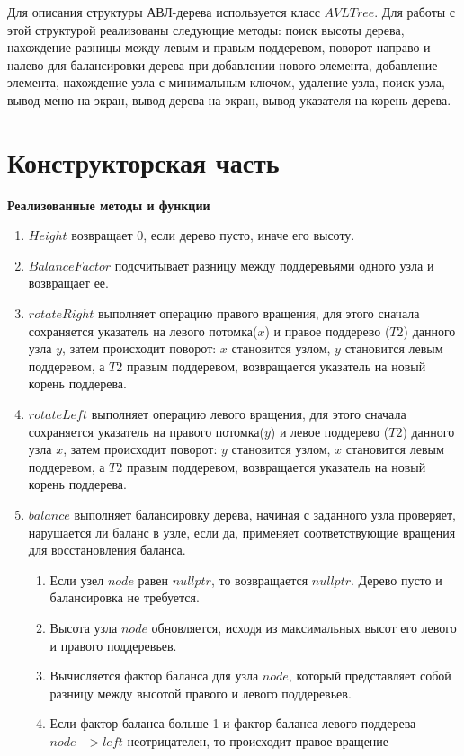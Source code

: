 \documentclass[12pt, a4paper]{article}
\begin{document}
Для описания структуры АВЛ-дерева используется класс $AVLTree$.
Для работы с этой структурой реализованы следующие методы: поиск высоты 
дерева, нахождение разницы между левым и правым поддеревом, поворот направо
и налево для балансировки дерева при добавлении нового элемента, добавление
элемента, нахождение узла с минимальным ключом, удаление узла, поиск узла,
вывод меню на экран, вывод дерева на экран, вывод указателя на корень 
дерева.
\newpage
\section{Конструкторская часть}
\textbf{Реализованные методы и функции}
\begin{enumerate}
	\item $Height$ возвращает $0$, если дерево пусто, иначе его высоту.
	\item $BalanceFactor$ подсчитывает разницу между поддеревьями одного
	узла и возвращает ее.
	\item $rotateRight$ выполняет операцию правого вращения, для этого 
	сначала сохраняется указатель на левого потомка($x$) и правое поддерево
	($T2$) данного узла $y$, затем происходит поворот: $x$ становится 
	узлом, $y$ становится левым поддеревом, а $T2$ правым поддеревом, 
	возвращается указатель на новый корень поддерева.
	\item $rotateLeft$ выполняет операцию левого вращения, для этого 
	сначала сохраняется указатель на правого потомка($y$) и левое поддерево
	($T2$) данного узла $x$, затем происходит поворот: $y$ становится 
	узлом, $x$ становится левым поддеревом, а $T2$ правым поддеревом, 
	возвращается указатель на новый корень поддерева.
	\item $balance$ выполняет балансировку дерева, начиная с заданного узла
	проверяет, нарушается ли баланс в узле, если да, применяет 
	соответствующие вращения для восстановления баланса.
	\begin{enumerate}
		\item Если узел $node$ равен $nullptr$, то возвращается $nullptr$. 
		Дерево пусто и балансировка не требуется.
		\item Высота узла $node$ обновляется, исходя из максимальных высот 
		его левого и правого поддеревьев.
		\item Вычисляется фактор баланса для узла $node$, который 
		представляет собой разницу между высотой правого и левого 
		поддеревьев.
		\item Если фактор баланса больше 1 и фактор баланса левого 
		поддерева $node->left$ неотрицателен, то происходит правое вращение 

\end{enumerate}
\end{enumerate}
\end{document}
